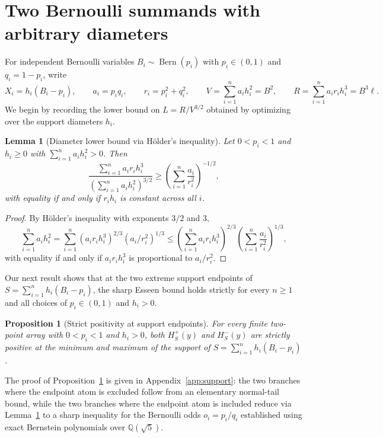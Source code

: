 \documentclass[11pt]{article}
\numberwithin{equation}{section}
\newtheorem{proposition}[theorem]{Proposition}
\newtheorem{lemma}[theorem]{Lemma}
\theoremstyle{definition}
\theoremstyle{remark}
\DeclareMathOperator{\Bern}{Bern}
\begin{document}
\section{Two Bernoulli summands with arbitrary diameters}\label{sec:two}

For independent Bernoulli variables $B_i\sim\Bern(p_i)$ with $p_i\in(0,1)$
and $q_i=1-p_i$, write
\[
 X_i=h_i(B_i-p_i),\qquad a_i=p_iq_i,\qquad r_i=p_i^2+q_i^2,\qquad
 V=\sum_{i=1}^n a_i h_i^2=B^2,\qquad R=\sum_{i=1}^n a_ir_ih_i^3=B^3\ell.
\]
We begin by recording the lower bound on $L=R/V^{3/2}$ obtained by
optimizing over the support diameters $h_i$.

\begin{samepage}
\begin{lemma}[Diameter lower bound via H\"older's inequality]\label{lem:reciprocal-gap-resource}
Let $0<p_i<1$ and $h_i\geq0$ with $\sum_{i=1}^n a_i h_i^2>0$. Then
\begin{equation}\label{eq:reciprocal-gap-resource}
 \frac{\sum_{i=1}^n a_ir_ih_i^3}{(\sum_{i=1}^n a_ih_i^2)^{3/2}}
 \geq\left(\sum_{i=1}^n\frac{a_i}{r_i^2}\right)^{-1/2},
\end{equation}
with equality if and only if $r_i h_i$ is constant across all $i$.
\end{lemma}
\end{samepage}
\begin{proof}
By H\"older's inequality with exponents $3/2$ and $3$,
\[
 \sum_{i=1}^n a_i h_i^2
 =\sum_{i=1}^n(a_ir_ih_i^3)^{2/3}(a_i/r_i^2)^{1/3}
 \leq\left(\sum_{i=1}^n a_ir_ih_i^3\right)^{2/3}
      \left(\sum_{i=1}^n \frac{a_i}{r_i^2}\right)^{1/3},
\]
with equality if and only if $a_ir_ih_i^3$ is proportional to $a_i/r_i^2$.
\end{proof}

Our next result shows that at the two extreme support endpoints of
$S=\sum_{i=1}^n h_i(B_i-p_i)$, the sharp Esseen bound holds strictly for
every $n\ge1$ and all choices of $p_i\in(0,1)$ and $h_i>0$.

\begin{samepage}
\begin{proposition}[Strict positivity at support endpoints]\label{cor:all-support-owners}
For every finite two-point array with $0<p_i<1$ and $h_i>0$, both
$H_S^+(y)$ and $H_S^-(y)$ are strictly positive at the minimum and maximum
of the support of $S=\sum_{i=1}^n h_i(B_i-p_i)$.
\end{proposition}
\end{samepage}
The proof of Proposition~\ref{cor:all-support-owners} is given in
Appendix~\ref{app:support}: the two branches where the endpoint atom is
excluded follow from an elementary normal-tail bound, while the two branches
where the endpoint atom is included reduce via Lemma~\ref{lem:reciprocal-gap-resource}
to a sharp inequality for the Bernoulli odds $o_i=p_i/q_i$ established using
exact Bernstein polynomials over $\mathbb Q(\sqrt5)$.
\end{document}
